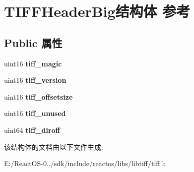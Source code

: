 \hypertarget{struct_t_i_f_f_header_big}{}\section{T\+I\+F\+F\+Header\+Big结构体 参考}
\label{struct_t_i_f_f_header_big}
\subsection*{Public 属性}
\begin{DoxyCompactItemize}
\item 
\mbox{\label{struct_t_i_f_f_header_big_a1da3f5b902d5f3f7b1b0ebafc727cf1f}} 
uint16 {\bfseries tiff\+\_\+magic}
\item 
\mbox{\label{struct_t_i_f_f_header_big_a800c5885ddab65e80f0be15b394fca0e}} 
uint16 {\bfseries tiff\+\_\+version}
\item 
\mbox{\label{struct_t_i_f_f_header_big_a5f2297912d099aa2005fa680c1555edb}} 
uint16 {\bfseries tiff\+\_\+offsetsize}
\item 
\mbox{\label{struct_t_i_f_f_header_big_aaf85d0caba2a0f17bac3df1e86009350}} 
uint16 {\bfseries tiff\+\_\+unused}
\item 
\mbox{\label{struct_t_i_f_f_header_big_a5b1890c3965fb428f2277b4acc0b8663}} 
uint64 {\bfseries tiff\+\_\+diroff}
\end{DoxyCompactItemize}


该结构体的文档由以下文件生成\+:\begin{DoxyCompactItemize}
\item 
E\+:/\+React\+O\+S-\/0../sdk/include/reactos/libs/libtiff/tiff.\+h\end{DoxyCompactItemize}
